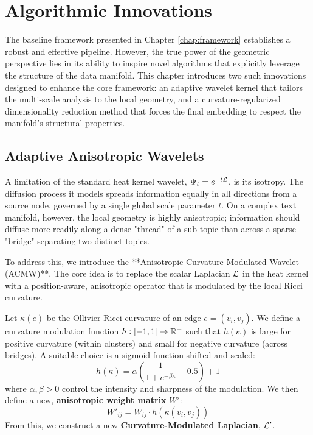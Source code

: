 \chapter{Algorithmic Innovations}
\label{chap:innovations}

The baseline framework presented in Chapter \ref{chap:framework} establishes a robust and effective pipeline. However, the true power of the geometric perspective lies in its ability to inspire novel algorithms that explicitly leverage the structure of the data manifold. This chapter introduces two such innovations designed to enhance the core framework: an adaptive wavelet kernel that tailors the multi-scale analysis to the local geometry, and a curvature-regularized dimensionality reduction method that forces the final embedding to respect the manifold's structural properties.

\section{Adaptive Anisotropic Wavelets}
\label{sec:adaptive_wavelets}
A limitation of the standard heat kernel wavelet, $\Psi_t = e^{-t\mathcal{L}}$, is its isotropy. The diffusion process it models spreads information equally in all directions from a source node, governed by a single global scale parameter $t$. On a complex text manifold, however, the local geometry is highly anisotropic; information should diffuse more readily along a dense "thread" of a sub-topic than across a sparse "bridge" separating two distinct topics.

To address this, we introduce the **Anisotropic Curvature-Modulated Wavelet (ACMW)**. The core idea is to replace the scalar Laplacian $\mathcal{L}$ in the heat kernel with a position-aware, anisotropic operator that is modulated by the local Ricci curvature.

\begin{definition}
Let $\kappa(e)$ be the Ollivier-Ricci curvature of an edge $e=(v_i, v_j)$. We define a curvature modulation function $h: [-1, 1] \to \mathbb{R}^+$ such that $h(\kappa)$ is large for positive curvature (within clusters) and small for negative curvature (across bridges). A suitable choice is a sigmoid function shifted and scaled:
\begin{equation}
    h(\kappa) = \alpha \left( \frac{1}{1 + e^{-\beta \kappa}} - 0.5 \right) + 1
\end{equation}
where $\alpha, \beta > 0$ control the intensity and sharpness of the modulation. We then define a new, \textbf{anisotropic weight matrix} $W'$:
\begin{equation}
    W'_{ij} = W_{ij} \cdot h(\kappa(v_i, v_j))
\end{equation}
From this, we construct a new \textbf{Curvature-Modulated Laplacian}, $\mathcal{L}'$.
\end{definition}

